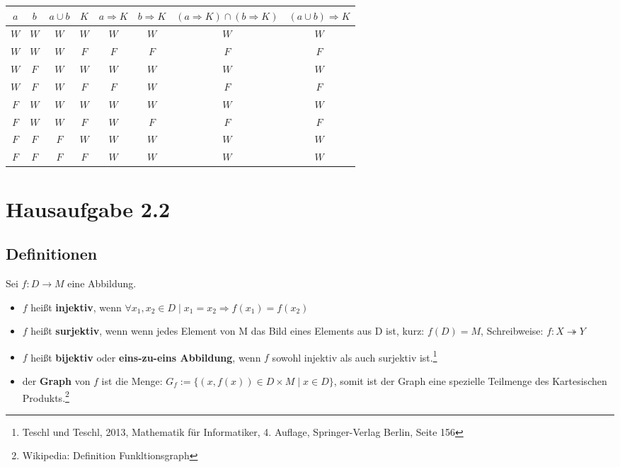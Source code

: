 \documentclass[titlepage]{article}
\begin{document}
		\begin{table}[h]
			\centering
			\begin{tabular}{cccccc|cc}
				$a$&$b$&$a\cup b$&$K$&$a\Rightarrow K$&$b\Rightarrow K$&$(a\Rightarrow K)\cap (b\Rightarrow K)$&$(a\cup b)\Rightarrow K$\\\hline
				$W$&$W$&$W$&$W$&$W$&$W$&$W$&$W$\\
				$W$&$W$&$W$&$F$&$F$&$F$&$F$&$F$\\
				$W$&$F$&$W$&$W$&$W$&$W$&$W$&$W$\\
				$W$&$F$&$W$&$F$&$F$&$W$&$F$&$F$\\
				$F$&$W$&$W$&$W$&$W$&$W$&$W$&$W$\\
				$F$&$W$&$W$&$F$&$W$&$F$&$F$&$F$\\
				$F$&$F$&$F$&$W$&$W$&$W$&$W$&$W$\\
				$F$&$F$&$F$&$F$&$W$&$W$&$W$&$W$\\
			\end{tabular}
		\end{table}

		 
	\section*{Hausaufgabe 2.2}
		\subsection*{Definitionen}
		Sei $f:D\rightarrow M$ eine Abbildung.
			\begin{itemize}
				\item $f$ heißt \textbf{injektiv}, wenn $\forall x_1,x_2 \in D \mid x_1=x_2 \Rightarrow f(x_1)=f(x_2)$
				\item $f$ heißt \textbf{surjektiv}, wenn wenn jedes Element von M das Bild eines Elements aus D ist, kurz: $f(D)=M$, Schreibweise: $f: X \twoheadrightarrow  Y$
				\item $f$ heißt \textbf{bijektiv} oder \textbf{eins-zu-eins Abbildung}, wenn $f$ sowohl injektiv als auch surjektiv ist.\footnote{Teschl und Teschl, 2013, Mathematik für Informatiker, 4. Auflage, Springer-Verlag Berlin, Seite 156}
				\item der \textbf{Graph} von $f$ ist die Menge: $G_f:=\{(x,f(x))\in D \times M \mid x\in D\}$, somit ist der Graph eine spezielle Teilmenge des Kartesischen Produkts.\footnote{Wikipedia: Definition Funkltionsgraph}
			\end{itemize}
		
\end{document}
